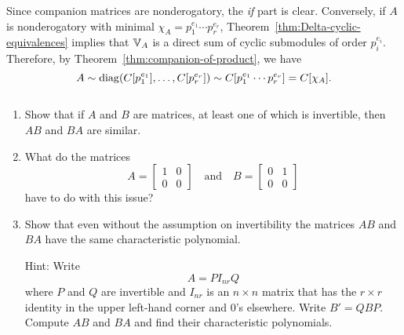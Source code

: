 \begin{solution}
    Since companion matrices are nonderogatory, the \textit{if\/} part is clear. Conversely, if $A$ is nonderogatory with minimal $\chi_A=p_1^{e_1}\cdots p_r^{e_r}$, Theorem~\ref{thm:Delta-cyclic-equivalences} implies that $\mathbb V_A$ is a direct sum of cyclic submodules of order $p_i^{e_i}$. Therefore, by Theorem~\ref{thm:companion-of-product}, we have
    $$
        A\sim\operatorname{{\operatorname{diag}}}(C[p_1^{e_1}],\dots,C[p_r^{e_r}])
            \sim C[p_1^{e_1}\cdots p_r^{e_r}] = C[\chi_A].
    $$
\end{solution}

\begin{exr}${}$
    \begin{enumerate}[\rm a)]
        \item Show that if\/ $A$ and $B$ are matrices, at least one of which is invertible, then\/ $AB$ and\/ $BA$ are similar.

        \item What do the matrices
        $$
            A = \begin{bmatrix}
                    1 & 0 \\
                    0 & 0
                \end{bmatrix} \quad \text{and} \quad
            B = \begin{bmatrix}
                    0 & 1 \\
                    0 & 0
                \end{bmatrix}
        $$
        have to do with this issue?

        \item Show that even without the assumption on invertibility the matrices\/ $AB$ and\/ $BA$ have the same characteristic polynomial.
        
        \textrm{\rm Hint: Write 
        $$
            A = PI_{nr}Q
        $$
        where $P$ and $Q$ are invertible and $I_{nr}$ is an $n \times n$ matrix that has the $r \times r$ identity in the upper left-hand corner and $0$'s elsewhere. Write $B' = QBP$. Compute $AB$ and $BA$ and find their characteristic polynomials.}
    \end{enumerate}
\end{exr}

